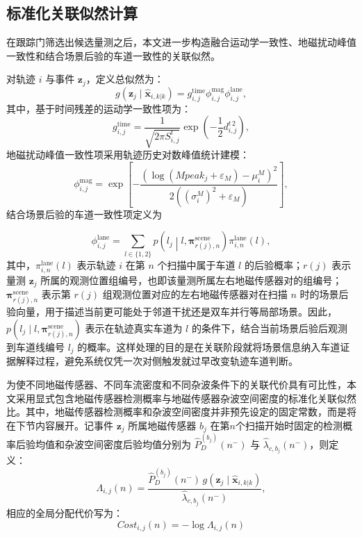 \documentclass{xdupgthesis}
\begin{document}
\subsection{标准化关联似然计算}

在跟踪门筛选出候选量测之后，本文进一步构造融合运动学一致性、地磁扰动峰值一致性和结合场景后验的车道一致性的关联似然。

对轨迹 $i$ 与事件 $\mathbf z_j$，定义总似然为：
\begin{equation}
	g(\mathbf z_j\mid \hat{\mathbf x}_{i,k|k})
	=
	g_{i,j}^{\mathrm{time}}
	\phi_{i,j}^{\mathrm{mag}}
	\phi_{i,j}^{\mathrm{lane}},
	\label{eq:ch3_total_likelihood}
\end{equation}
其中，基于时间残差的运动学一致性项为：
\begin{equation}
	g_{i,j}^{\mathrm{time}}
	=
	\frac{1}{\sqrt{2\pi S^{t}_{i,j}}}
	\exp\left(-\frac{1}{2}d^{t\,2}_{i,j}\right),
	\label{eq:ch3_g_time}
\end{equation}
地磁扰动峰值一致性项采用轨迹历史对数峰值统计建模：
\begin{equation}
	\phi_{i,j}^{\mathrm{mag}}
	=
	\exp\left[
	-\frac{
		\left(
		\log(Mpeak_j+\varepsilon_M)-\mu_i^{M}
		\right)^2
	}{2\left((\sigma_i^{M})^2+\varepsilon_M\right)}
	\right],
	\label{eq:ch3_phi_mag}
\end{equation}
结合场景后验的车道一致性项定义为

\begin{equation}
	\phi_{i,j}^{\mathrm{lane}}
	=
	\sum_{l\in\{1,2\}}
	p\!\left(l_j\middle|l,\boldsymbol\pi_{r(j),n}^{\mathrm{scene}}\right)
	\pi_{i,n}^{\mathrm{lane}}(l),
	\label{eq:ch3_phi_lane}
\end{equation}
其中，$\pi_{i,n}^{\mathrm{lane}}(l)$ 表示轨迹 $i$ 在第 $n$ 个扫描中属于车道 $l$ 的后验概率；$r(j)$ 表示量测 $\mathbf z_j$ 所属的观测位置组编号，也即该量测所属左右地磁传感器对的组编号；$\boldsymbol\pi_{r(j),n}^{\mathrm{scene}}$ 表示第 $r(j)$ 组观测位置对应的左右地磁传感器对在扫描 $n$ 时的场景后验向量，用于描述当前更可能处于邻道干扰还是双车并行等局部场景。因此，$p(l_j\mid l,\boldsymbol\pi_{r(j),n}^{\mathrm{scene}})$ 表示在轨迹真实车道为 $l$ 的条件下，结合当前场景后验后观测到车道线编号 $l_j$ 的概率。这样处理的目的是在关联阶段就将场景信息纳入车道证据解释过程，避免系统仅凭一次对侧触发就过早改变轨迹车道判断。

为使不同地磁传感器、不同车流密度和不同杂波条件下的关联代价具有可比性，本文采用显式包含地磁传感器检测概率与地磁传感器杂波空间密度的标准化关联似然比。其中，地磁传感器检测概率和杂波空间密度并非预先设定的固定常数，而是将在下节内容展开。记事件 $\mathbf z_j$ 所属地磁传感器 $b_j$ 在第$n$个扫描开始时固定的检测概率后验均值和杂波空间密度后验均值分别为 $\hat P_D^{(b_j)}(n^-)$ 与 $\hat\lambda_{c,b_j}(n^-)$，则定义：
\begin{equation}
	\Lambda_{i,j}(n)
	=
	\frac{\hat P_D^{(b_j)}(n^-)\,g(\mathbf z_j\mid \hat{\mathbf x}_{i,k|k})}{\hat\lambda_{c,b_j}(n^-)},
	\label{eq:ch3_assoc_ratio}
\end{equation}
相应的全局分配代价写为：
\begin{equation}
	Cost_{i,j}(n)=-\log \Lambda_{i,j}(n)
	\label{eq:ch3_assoc_cost}
\end{equation}
\end{document}
